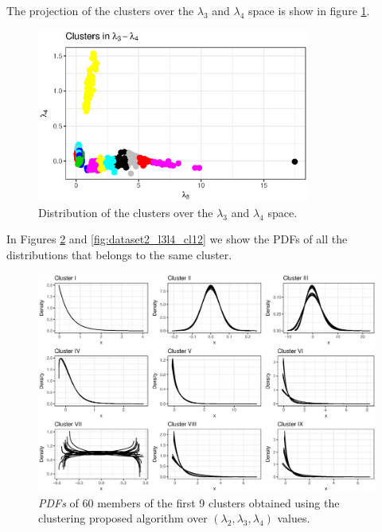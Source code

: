 The projection of the clusters over the $\lambda_{3}$ and $\lambda_{4}$ space is show in figure \ref{fig:dataset2_l3l4_l3_l4}.

\begin{figure}[H]
    \centering
    \includegraphics[width=0.8\textwidth]{img/gld_clustering/datasetII/l3l4/l3_l4.eps}
    \caption{Distribution of the clusters over the $\lambda_{3}$ and $\lambda_{4}$ space.}
    \label{fig:dataset2_l3l4_l3_l4}
\end{figure}

In Figures \ref{fig:dataset2_l3l4_cl1} and \ref{fig:dataset2_l3l4_cl12} we show the PDFs of all the distributions that belongs to the same cluster.

\begin{figure}[H]
    \centering
    \includegraphics[width=\textwidth]{img/gld_clustering/datasetII/l3l4/clusters_part_I_scale_2.eps}
    \caption{\textit{PDFs} of 60 members of the first 9 clusters obtained using the clustering  proposed algorithm over $(\lambda_{2}, \lambda_{3}, \lambda_{4})$ values.}
    \label{fig:dataset2_l3l4_cl1}
\end{figure}

